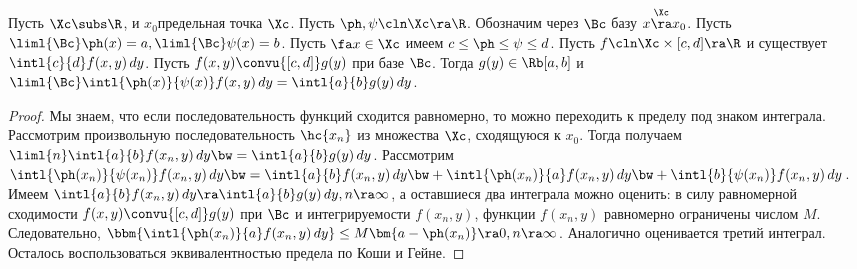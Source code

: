 \documentclass[a4paper]{article}
\newcommand{\intlab}{\intl{a}{b}}
\begin{document}
\begin{theorem}
Пусть $\Xc \subs \R$, и $x_0$\т предельная точка $\Xc$. Пусть $\ph, \psi\cln \Xc \ra \R$. Обозначим
через $\Bc$ базу $x \overset{\Xc}{\ra} x_0$. Пусть $\liml{\Bc}\ph(x)=a, \liml{\Bc}\psi(x)=b$. Пусть
$\fa x \in \Xc$ имеем $c \le \ph \le \psi \le d$. Пусть $f\cln \Xc\times[c,d]\ra \R$ и существует
$\intl{c}{d}f(x,y)\,d y$. Пусть $f(x,y)\convu{[c,d]}g(y)$ при базе $\Bc$. Тогда $g(y)\in\Rb[a,b]$
и $\liml{\Bc}\intl{\ph(x)}{\psi(x)}f(x,y)\,d y=\intlab g(y)\,d y$.
\end{theorem}
\begin{proof}
Мы знаем, что если последовательность функций сходится равномерно, то можно переходить к пределу
под знаком интеграла. Рассмотрим произвольную последовательность $\hc{x_n}$ из множества $\Xc$,
сходящуюся к $x_0$. Тогда получаем $\liml{n}\intlab f(x_n,y)\,dy\bw=\intlab g(y)\,dy$. Рассмотрим
$\intl{\ph(x_n)}{\psi(x_n)}f(x_n,y)\,dy\bw=\intlab f(x_n,y)\,dy\bw+\intl{\ph(x_n)}{a}f(x_n,y)\,dy\bw+
\intl{b}{\psi(x_n)}f(x_n,y)\,dy$. Имеем $\intlab f(x_n,y)\,dy \ra \intlab g(y)\,d y, n \ra
\infty$, а оставшиеся два интеграла можно оценить: в силу равномерной сходимости
$f(x,y)\convu{[c,d]}g(y)$ при $\Bc$ и интегрируемости $f(x_n,y)$, функции $f(x_n,y)$ равномерно
ограничены числом $M$. Следовательно, $\bbm{\intl{\ph(x_n)}{a}f(x_n,y)\,d y} \le M\bm{a-\ph(x_n)} \ra
0, n \ra \infty$. Аналогично оценивается третий интеграл. Осталось воспользоваться эквивалентностью
предела по Коши и Гейне.
\end{proof}
\end{document}
